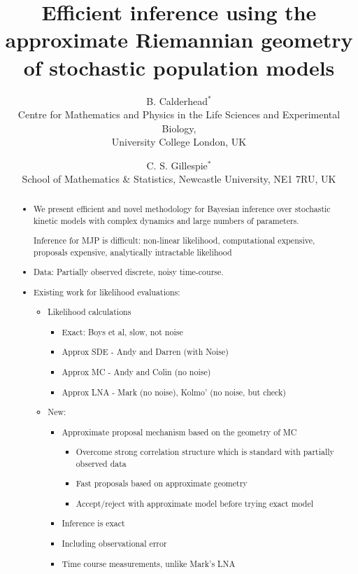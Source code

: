 \documentclass[useAMS,usenatbib,referee]{example/biom}
\title[Efficient inference using the approximate Riemannian geometry of stochastic population models]{Efficient inference using the approximate Riemannian geometry of stochastic population models}
\author{B. Calderhead$^{*}$\email{b.calderhead@ucl.ac.uk} \\
	   Centre for Mathematics and Physics in the Life Sciences and Experimental Biology,\\University College London, UK
	   \and 
	   C. S. Gillespie$^{*}$\email{colin.gillespie@newcastle.ac.uk}\\
	   School of Mathematics \& Statistics, Newcastle University,
	   NE1 7RU, UK
	   }
\begin{document}
\date{}

\pagerange{\pageref{firstpage}--\pageref{lastpage}} 



\label{firstpage}


\begin{abstract}
\begin{itemize}
\item We present efficient and novel methodology for Bayesian inference over stochastic kinetic models with complex dynamics and large numbers of parameters.

Inference for MJP is difficult: non-linear likelihood, computational
  expensive, proposals expensive, analytically intractable likelihood
\item Data: Partially observed discrete, noisy time-course.
\item Existing work for likelihood evaluations: 
\begin{itemize}
\item Likelihood calculations
\begin{itemize}
\item Exact: Boys et al, slow, not noise
\item Approx SDE - Andy and Darren (with Noise)
\item Approx MC - Andy and Colin (no noise)
\item Approx LNA - Mark (no noise), Kolmo' (no noise, but check)
\end{itemize}
\item New:
\begin{itemize}
\item Approximate proposal mechanism based on the geometry of MC
\begin{itemize}
\item Overcome strong correlation structure which is standard with partially
  observed data
\item Fast proposals based on approximate geometry
\item Accept/reject with approximate model before trying exact model
\end{itemize}
\item Inference is exact
\item Including observational error
\item Time course measurements, unlike Mark's LNA
\end{itemize}
\end{itemize}
\end{itemize}
\end{abstract}
\end{document}

